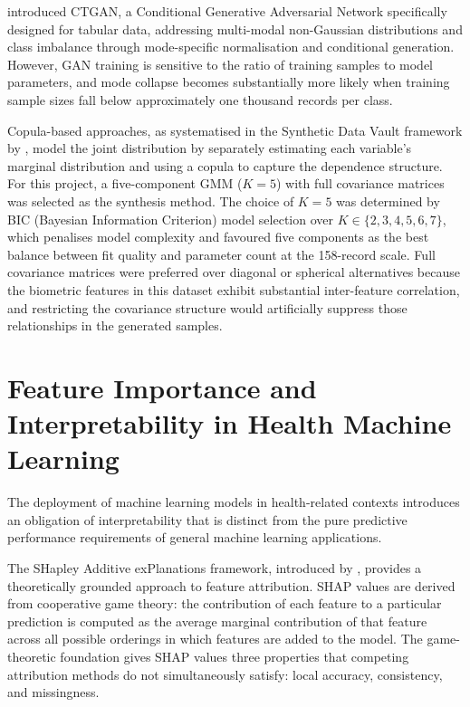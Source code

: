 \documentclass[11pt,a4paper]{report}
\begin{document}
\citet{Xu2019} introduced CTGAN, a Conditional Generative Adversarial Network specifically designed
for tabular data, addressing multi-modal non-Gaussian distributions and class imbalance through
mode-specific normalisation and conditional generation. However, GAN training is sensitive to the
ratio of training samples to model parameters, and mode collapse becomes substantially more likely
when training sample sizes fall below approximately one thousand records per class.

Copula-based approaches, as systematised in the Synthetic Data Vault framework by \citet{Patki2016},
model the joint distribution by separately estimating each variable's marginal distribution and using
a copula to capture the dependence structure. For this project, a five-component GMM ($K=5$) with full covariance matrices was selected as the
synthesis method. The choice of $K=5$ was determined by BIC (Bayesian Information Criterion) model
selection over $K \in \{2, 3, 4, 5, 6, 7\}$, which penalises model complexity and favoured five
components as the best balance between fit quality and parameter count at the 158-record scale. Full
covariance matrices were preferred over diagonal or spherical alternatives because the biometric
features in this dataset exhibit substantial inter-feature correlation, and restricting the
covariance structure would artificially suppress those relationships in the generated samples.

\section{Feature Importance and Interpretability in Health Machine Learning}

The deployment of machine learning models in health-related contexts introduces an obligation of
interpretability that is distinct from the pure predictive performance requirements of general
machine learning applications.

The SHapley Additive exPlanations framework, introduced by \citet{Lundberg2017}, provides a
theoretically grounded approach to feature attribution. SHAP values are derived from cooperative
game theory: the contribution of each feature to a particular prediction is computed as the average
marginal contribution of that feature across all possible orderings in which features are added to
the model. The game-theoretic foundation gives SHAP values three properties that competing attribution methods do
not simultaneously satisfy: local accuracy, consistency, and missingness.
\end{document}
